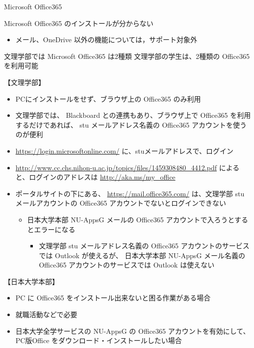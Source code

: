 \documentclass[a4j,10pt]{jsarticle}
\begin{document}
{\begin{frame}[label={sec:org712dbc5},fragile]{Microsoft Office365}
\begin{block}{Microsoft Office365 のインストールが分からない}
\begin{enumerate}
\begin{itemize}
\item メール、OneDrive 以外の機能については，サポート対象外
\end{itemize}
\end{enumerate}
\end{block}
\par
\begin{block}{文理学部では Microsoft Office365 は2種類}
文理学部の学生は、2種類の Office365 を利用可能
\par
\begin{block}{【文理学部】}
\begin{itemize}
\item PCにインストールをせず、ブラウザ上の Office365 のみ利用
\item 文理学部では、 Blackboard との連携もあり、ブラウザ上で Office365 を利用するだけであれば、
stu メールアドレス名義の Office365 アカウントを使うのが便利
\par
\item \url{https://login.microsoftonline.com/} に、stuメールアドレスで、ログイン
\item \url{http://www.cc.chs.nihon-u.ac.jp/topics/files/1459308480\_4412.pdf}
によると、ログインのアドレスは \url{http://aka.ms/my\_office}
\par
\item ポータルサイトの下にある、
\url{https://mail.office365.com/}
は、文理学部 stuメールアカウントの Office365 アカウントでないとログインできない
\begin{itemize}
\item 日本大学本部 NU-AppsG メールの Office365 アカウントで入ろうとするとエラーになる
\begin{itemize}
\item 文理学部 stu メールアドレス名義の Office365 アカウントのサービスでは Outlook が使えるが、
日本大学本部 NU-AppsG メール名義の Office365 アカウントのサービスでは Outlook は使えない
\end{itemize}
\end{itemize}
\end{itemize}
\end{block}
\par
\begin{block}{【日本大学本部】}
\begin{itemize}
\item PC に Office365 をインストール出来ないと困る作業がある場合
\item 就職活動などで必要
\item 日本大学全学サービスの NU-AppsG の Office365 アカウントを有効にして、PC版Office をダウンロード・インストールしたい場合

\end{itemize}
\end{block}
\end{block}
\end{frame}}
\end{document}
